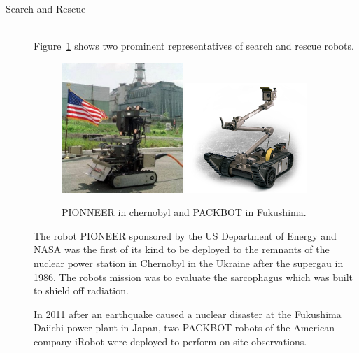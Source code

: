 \begin{description}
\item[Search and Rescue]\hfill \\

Figure~\ref{fig:fig_rescue} shows two prominent representatives of search and rescue robots.
\begin{figure}[thpb]
	  \myfloatalign
      \footnotesize
      \centering
    \subfloat
    {  \label{fig:fig_chernobyl}
        \includegraphics[width=0.45\textwidth,height=0.2\textheight]{figures/fig_chernobyl_pioneer.jpg}
    }
    \subfloat
    {  \label{fig:fig_fukushima}
        \includegraphics[width=0.45\textwidth,height=0.2\textheight]{figures/fig_packbot.png}
    }     
   \caption[Rescue robots]{PIONNEER in chernobyl and PACKBOT in Fukushima.}
   \label{fig:fig_rescue}
\end{figure}

The robot PIONEER sponsored by the US Department of Energy and NASA was the first of its kind to be deployed to the remnants of the nuclear power station in Chernobyl in the Ukraine after the supergau in 1986. 
The robots mission was to evaluate the sarcophagus which was built to shield off radiation.

In 2011 after an earthquake caused a nuclear disaster at the Fukushima Daiichi power plant in Japan, two PACKBOT robots of the American company iRobot were deployed to perform on site observations.


\end{description}
